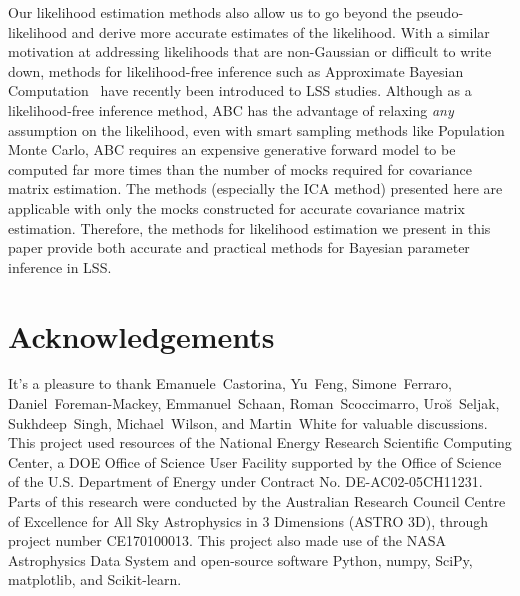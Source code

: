 \documentclass[12pt, letterpaper, preprint]{aastex}
\let\oldmarginpar\marginpar
\renewcommand\marginpar[1]{\-\oldmarginpar[\raggedleft\footnotesize #1]%
  {\raggedright\footnotesize #1}}
\newcommand{\todo}[1]{\marginpar{\color{red}TODO}{\color{red}#1}}
\newcommand{\lss}{{\small{LSS}}\xspace}
\newcommand{\ica}{{\small{ICA}}\xspace}
\begin{document}
Our likelihood estimation methods also allow us to go beyond the pseudo-likelihood 
and derive more accurate estimates of the likelihood. With a similar 
motivation at addressing likelihoods that are non-Gaussian or difficult to 
write down, methods for likelihood-free inference such as Approximate Bayesian 
Computation~\citep[ABC;][]{hahn2017b,kacprzak2017,alsing2018} have recently 
been introduced to \lss studies. 
Although as a likelihood-free inference method, ABC has the advantage 
of relaxing \emph{any} assumption on the likelihood, even with smart sampling methods 
like Population Monte Carlo, ABC requires an expensive generative forward 
model to be computed far more times than the number of mocks required for 
covariance matrix estimation. The methods (especially the \ica method)
presented here are applicable with only the mocks constructed for accurate covariance 
matrix estimation. Therefore, the methods for likelihood estimation we present
in this paper provide both accurate and practical methods for Bayesian 
parameter inference in \lss. 

\section*{Acknowledgements}
It's a pleasure to thank 
    Emanuele~Castorina,
    Yu~Feng, 
    Simone~Ferraro,
    Daniel~Foreman-Mackey, 
    Emmanuel~Schaan, 
    Roman~Scoccimarro,
    Uro{\u s}~Seljak,
    Sukhdeep~Singh, 
    Michael~Wilson, 
    and Martin~White
for valuable discussions.
\todo{more acknowledgements}
This project used resources of the National Energy Research 
Scientific Computing Center, a DOE Office of Science User 
Facility supported by the Office of Science of the U.S. 
Department of Energy under Contract No. DE-AC02-05CH11231.
Parts of this research were conducted by the Australian Research Council
Centre of Excellence for All Sky Astrophysics in 3 Dimensions (ASTRO 3D),
through project number CE170100013.
This project also made use of the NASA Astrophysics Data 
System and open-source software Python, numpy, SciPy, matplotlib, 
and Scikit-learn. 



\end{document}
